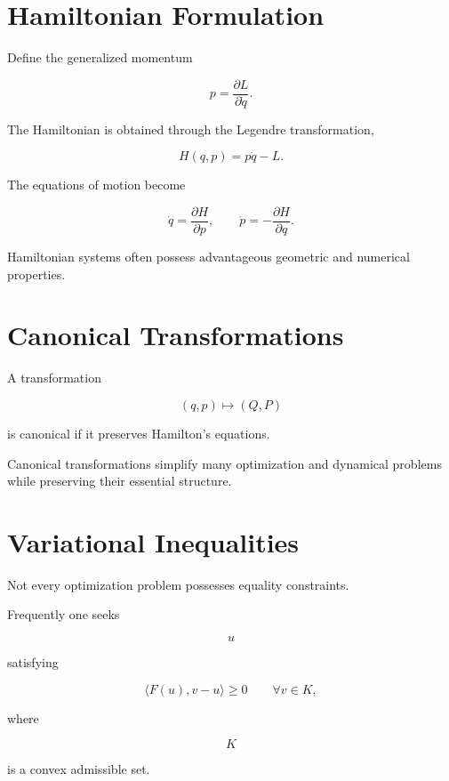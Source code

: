 \documentclass[11pt,fleqn]{book}
\numberwithin{equation}{chapter}
\theoremstyle{plain}
\theoremstyle{definition}
\theoremstyle{remark}
\begin{document}

\section{Hamiltonian Formulation}

Define the generalized momentum

\[
\boxed{
p
=
\frac{\partial L}{\partial\dot q}.
}
\]

The Hamiltonian is obtained through the Legendre transformation,

\[
\boxed{
H(q,p)
=
p\dot q
-
L.
}
\]

The equations of motion become

\[
\boxed{
\dot q
=
\frac{\partial H}{\partial p},
\qquad
\dot p
=
-
\frac{\partial H}{\partial q}.
}
\]

Hamiltonian systems often possess advantageous geometric and numerical
properties.


\section{Canonical Transformations}

A transformation

\[
(q,p)
\mapsto
(Q,P)
\]

is canonical if it preserves Hamilton's equations.

Canonical transformations simplify many optimization and dynamical
problems while preserving their essential structure.


\section{Variational Inequalities}

Not every optimization problem possesses equality constraints.

Frequently one seeks

\[
u
\]

satisfying

\[
\boxed{
\langle
F(u),
v-u
\rangle
\ge
0
\qquad
\forall v\in K,
}
\]

where

\[
K
\]

is a convex admissible set.
\end{document}
